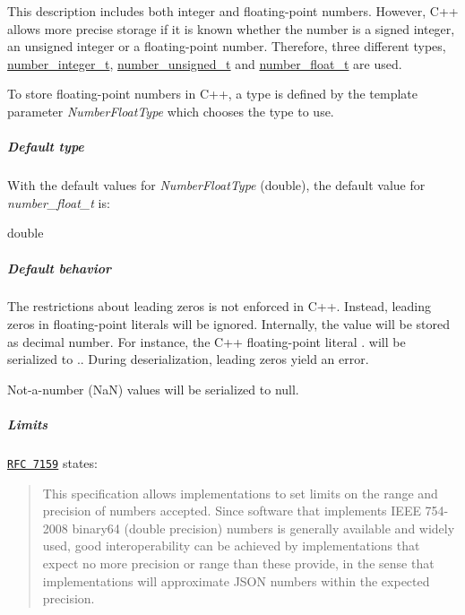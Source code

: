 This description includes both integer and floating-\/point numbers. However, C++ allows more precise storage if it is known whether the number is a signed integer, an unsigned integer or a floating-\/point number. Therefore, three different types, \hyperlink{classnlohmann_1_1basic__json_ac4b10b2364f26ce47bdb9a413ff04a59}{number\-\_\-integer\-\_\-t}, \hyperlink{classnlohmann_1_1basic__json_a60a04166c122072ab11eaf9845d9cd1d}{number\-\_\-unsigned\-\_\-t} and \hyperlink{classnlohmann_1_1basic__json_a74a0013e847fdc574b48f931f0e757e1}{number\-\_\-float\-\_\-t} are used.

To store floating-\/point numbers in C++, a type is defined by the template parameter {\itshape Number\-Float\-Type} which chooses the type to use.

\subparagraph*{Default type}

With the default values for {\itshape Number\-Float\-Type} ({\ttfamily double}), the default value for {\itshape number\-\_\-float\-\_\-t} is\-:


\begin{DoxyCode}
\textcolor{keywordtype}{double}
\end{DoxyCode}


\subparagraph*{Default behavior}


\begin{DoxyItemize}
\item The restrictions about leading zeros is not enforced in C++. Instead, leading zeros in floating-\/point literals will be ignored. Internally, the value will be stored as decimal number. For instance, the C++ floating-\/point literal {.} will be serialized to {.}. During deserialization, leading zeros yield an error.
\item Not-\/a-\/number (Na\-N) values will be serialized to {\ttfamily null}.
\end{DoxyItemize}

\subparagraph*{Limits}

\href{http://rfc7159.net/rfc7159}{\tt R\-F\-C 7159} states\-: \begin{quotation}
This specification allows implementations to set limits on the range and precision of numbers accepted. Since software that implements I\-E\-E\-E 754-\/2008 binary64 (double precision) numbers is generally available and widely used, good interoperability can be achieved by implementations that expect no more precision or range than these provide, in the sense that implementations will approximate J\-S\-O\-N numbers within the expected precision.

\end{quotation}


